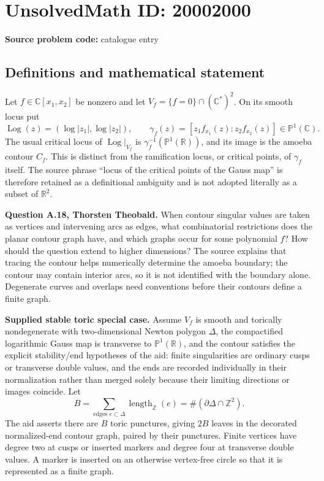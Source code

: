 \documentclass[11pt]{article}
\newcommand{\Z}{\mathbb{Z}}
\newcommand{\R}{\mathbb{R}}
\newcommand{\C}{\mathbb{C}}
\newcommand{\PP}{\mathbb{P}}
\begin{document}
\section*{UnsolvedMath ID: 20002000}
\textbf{Source problem code:} catalogue entry
\subsection{Definitions and mathematical statement}
Let $f\in\C[x_1,x_2]$ be nonzero and let $V_f=\{f=0\}\cap(\C^*)^2$. On its smooth locus put
\[
 \operatorname{Log}(z)=(\log|z_1|,\log|z_2|),\qquad
 \gamma_f(z)=[z_1f_{x_1}(z):z_2f_{x_2}(z)]\in\PP^1(\C).
\]
The usual critical locus of $\operatorname{Log}|_{V_f}$ is $\gamma_f^{-1}(\PP^1(\R))$, and its image is the amoeba contour $C_f$. This is distinct from the ramification locus, or critical points, of $\gamma_f$ itself. The source phrase ``locus of the critical points of the Gauss map'' is therefore retained as a definitional ambiguity and is not adopted literally as a subset of $\R^2$.

\textbf{Question A.18, Thorsten Theobald.} When contour singular values are taken as vertices and intervening arcs as edges, what combinatorial restrictions does the planar contour graph have, and which graphs occur for some polynomial $f$? How should the question extend to higher dimensions? The source explains that tracing the contour helps numerically determine the amoeba boundary; the contour may contain interior arcs, so it is not identified with the boundary alone. Degenerate curves and overlaps need conventions before their contours define a finite graph.

\textbf{Supplied stable toric special case.} Assume $V_f$ is smooth and torically nondegenerate with two-dimensional Newton polygon $\Delta$, the compactified logarithmic Gauss map is transverse to $\PP^1(\R)$, and the contour satisfies the explicit stability/end hypotheses of the aid: finite singularities are ordinary cusps or transverse double values, and the ends are recorded individually in their normalization rather than merged solely because their limiting directions or images coincide. Let
\[
 B=\sum_{\text{edges }e\subset\Delta}\operatorname{length}_{\Z}(e)
   =\#(\partial\Delta\cap\Z^2).
\]
The aid asserts there are $B$ toric punctures, giving $2B$ leaves in the decorated normalized-end contour graph, paired by their punctures. Finite vertices have degree two at cusps or inserted markers and degree four at transverse double values. A marker is inserted on an otherwise vertex-free circle so that it is represented as a finite graph.
\end{document}
